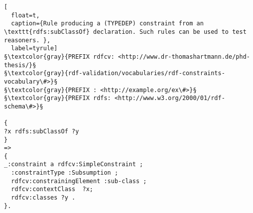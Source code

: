 % 

\begin{lstlisting}[
  float=t,
  caption={Rule producing a (TYPEDEP) constraint from an \texttt{rdfs:subClassOf} declaration. Such rules can be used to test reasoners. },
  label=tyrule]
§\textcolor{gray}{PREFIX rdfcv: <http://www.dr-thomashartmann.de/phd-thesis/}§
§\textcolor{gray}{rdf-validation/vocabularies/rdf-constraints-vocabulary\#>}§
§\textcolor{gray}{PREFIX : <http://example.org/ex\#>}§
§\textcolor{gray}{PREFIX rdfs: <http://www.w3.org/2000/01/rdf-schema\#>}§

{
?x rdfs:subClassOf ?y
}
=>
{
_:constraint a rdfcv:SimpleConstraint ;
  :constraintType :Subsumption ;
  rdfcv:constrainingElement :sub-class ;
  rdfcv:contextClass  ?x;
  rdfcv:classes ?y .
}.
\end{lstlisting}

% 
% 
% 
% 
% 

